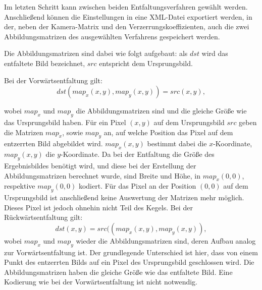 Im letzten Schritt kann zwischen beiden Entfaltungsverfahren gewählt werden. Anschließend können die Einstellungen in eine XML-Datei exportiert werden, in der, neben der Kamera-Matrix und den Verzerrungskoeffizienten, auch die zwei Abbildungsmatrizen des ausgewählten Verfahrens gespeichert werden.


Die Abbildungsmatrizen sind dabei wie folgt aufgebaut: als $dst$ wird das entfaltete Bild bezeichnet, $src$ entspricht dem Ursprungsbild.

Bei der Vorwärtsentfaltung gilt:
\[
dst(map_x(x,y), map_y(x,y)) = src(x,y),
\]

wobei $map_x$ und $map_y$ die Abbildungsmatrizen sind und die gleiche Größe wie das Ursprungsbild haben. Für ein Pixel $(x,y)$ auf dem Ursprungsbild $src$ geben die Matrizen $map_x$, sowie $map_y$ an, auf welche Position das Pixel auf dem entzerrten Bild abgebildet wird. $map_x(x,y)$ bestimmt dabei die $x$-Koordinate, $map_y(x,y)$ die $y$-Koordinate. Da bei der Entfaltung die Größe des Ergebnisbildes benötigt wird, und diese bei der Erstellung der Abbildungsmatrizen berechnet wurde, sind Breite und Höhe, in $map_x(0,0)$, respektive $map_y(0,0)$ kodiert. Für das Pixel an der Position $(0,0)$ auf dem Ursprungsbild ist anschließend keine Auswertung der Matrizen mehr möglich. Dieses Pixel ist jedoch ohnehin nicht Teil des Kegels.
\newpage
Bei der Rückwärtsentfaltung gilt:
\[
dst(x,y) = src((map_x(x,y),map_y(x,y)),
\]
wobei $map_x$ und $map_y$ wieder die Abbildungsmatrizen sind, deren Aufbau analog zur Vorwärtsentfaltung ist. 
Der grundlegende Unterschied ist hier, dass von einem Punkt des entzerrten Bilds auf ein Pixel des Ursprungsbild geschlossen wird. 
Die Abbildungsmatrizen haben die gleiche Größe wie das entfaltete Bild. Eine Kodierung wie bei der Vorwärtsentfaltung ist nicht notwendig.
